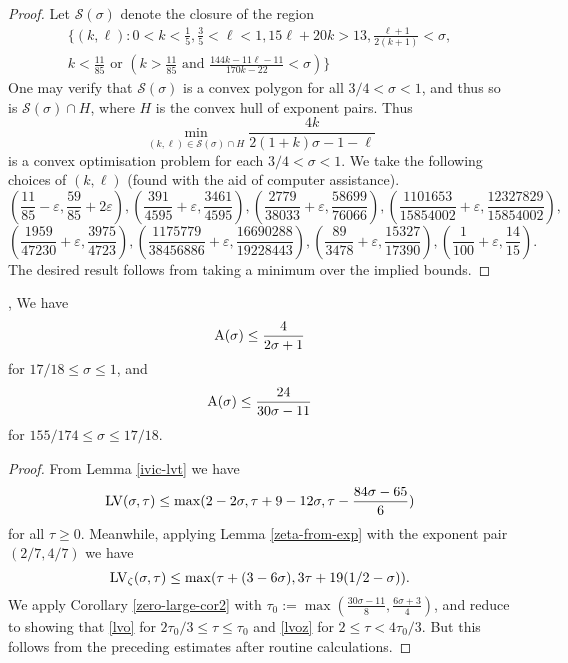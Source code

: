 \begin{proof}
Let $\mathcal{S}(\sigma)$ denote the closure of the region
\begin{align*}
\Bigg\{(k, \ell) : 0 < k < \frac{1}{5}, \frac{3}{5} < \ell < 1, 15\ell + 20k > 13, \frac{\ell + 1}{2(k + 1)} < \sigma, \\
k < \frac{11}{85} \text{ or } \left(k > \frac{11}{85} \text{ and } \frac{144k - 11\ell - 11}{170k - 22} < \sigma\right)\Bigg\}
\end{align*}
One may verify that $\mathcal{S}(\sigma)$ is a convex polygon for all $3/4 < \sigma < 1$, and thus so is $\mathcal{S}(\sigma) \cap H$, where $H$ is the convex hull of exponent pairs. Thus
\[
\min_{(k, \ell) \in \mathcal{S}(\sigma) \cap H}\frac{4k}{2(1 + k)\sigma - 1 - \ell}
\]
is a convex optimisation problem for each $3/4 < \sigma < 1$. 
We take the following choices of $(k, \ell)$ (found with the aid of computer assistance). 
\[
\left(\frac{11}{85} - \varepsilon, \frac{59}{85} + 2\varepsilon\right), 
\left(\frac{391}{4595} + \varepsilon, \frac{3461}{4595}\right), 
\left(\frac{2779}{38033} + \varepsilon, \frac{58699}{76066}\right),
\left(\frac{1101653}{15854002} + \varepsilon, \frac{12327829}{15854002}\right),
\]
\[
\left(\frac{1959}{47230} + \varepsilon, \frac{3975}{4723}\right),
\left(\frac{1175779}{38456886} + \varepsilon, \frac{16690288}{19228443}\right),
\left(\frac{89}{3478} + \varepsilon, \frac{15327}{17390}\right),
\left(\frac{1}{100} + \varepsilon, \frac{14}{15}\right).
\]
The desired result follows from taking a minimum over the implied bounds. 
\end{proof}


\begin{lemma}\label{ivic-zero-density}\cite{ivic_exponent_pairs}, \cite[Theorem 11.2]{ivic} We have
    $$ \mathrm{A}(\sigma) \leq \frac{4}{2\sigma+1}$$
    for $17/18 \leq \sigma \leq 1$, and
    $$ \mathrm{A}(\sigma) \leq \frac{24}{30\sigma-11}$$
    for $155/174 \leq \sigma \leq 17/18$.
\end{lemma}
\literature
{}

\begin{proof}  From Lemma \ref{ivic-lvt} we have
$$  \mathrm{LV}(\sigma,\tau) \leq \max( 2-2\sigma, \tau + 9-12\sigma, \tau - \frac{84\sigma-65}{6})$$
for all $\tau \geq 0$.  Meanwhile, applying Lemma \ref{zeta-from-exp} with the exponent pair $(2/7,4/7)$ we have
$$ \mathrm{LV}_\zeta(\sigma,\tau) \leq \max( \tau + (3-6\sigma), 3\tau + 19(1/2-\sigma)).$$
We apply Corollary \ref{zero-large-cor2} with $\tau_0 := \max( \frac{30\sigma-11}{8}, \frac{6\sigma+3}{4} )$, and reduce to showing that \eqref{lvo} for $2\tau_0/3 \leq \tau \leq \tau_0$ and \eqref{lvoz} for $2 \leq \tau < 4\tau_0/3$.  But this follows from the preceding estimates after routine calculations.
\end{proof}

